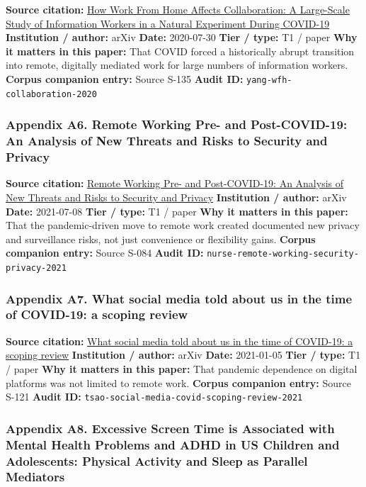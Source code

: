 \documentclass[
  american,
  11pt,
  letterpaper,
]{article}
\begin{document}
\textbf{Source citation:} \href{https://arxiv.org/abs/2007.15584}{How
Work From Home Affects Collaboration: A Large-Scale Study of Information
Workers in a Natural Experiment During COVID-19} \textbf{Institution /
author:} arXiv \textbf{Date:} 2020-07-30 \textbf{Tier / type:} T1 /
paper \textbf{Why it matters in this paper:} That COVID forced a
historically abrupt transition into remote, digitally mediated work for
large numbers of information workers. \textbf{Corpus companion entry:}
Source S-135 \textbf{Audit ID:} \texttt{yang-wfh-collaboration-2020}

\subsubsection{Appendix A6. Remote Working Pre- and Post-COVID-19: An
Analysis of New Threats and Risks to Security and
Privacy}\label{ch-03-appendix-a6-remote-working-pre-and-post-covid-19-an-analysis-of-new-threats-and-risks-to-security-and-privacy}

\textbf{Source citation:} \href{https://arxiv.org/abs/2107.03907}{Remote
Working Pre- and Post-COVID-19: An Analysis of New Threats and Risks to
Security and Privacy} \textbf{Institution / author:} arXiv
\textbf{Date:} 2021-07-08 \textbf{Tier / type:} T1 / paper \textbf{Why
it matters in this paper:} That the pandemic-driven move to remote work
created documented new privacy and surveillance risks, not just
convenience or flexibility gains. \textbf{Corpus companion entry:}
Source S-084 \textbf{Audit ID:}
\texttt{nurse-remote-working-security-privacy-2021}

\subsubsection{Appendix A7. What social media told about us in the time
of COVID-19: a scoping
review}\label{ch-03-appendix-a7-what-social-media-told-about-us-in-the-time-of-covid-19-a-scoping-review}

\textbf{Source citation:} \href{https://arxiv.org/abs/2101.01688}{What
social media told about us in the time of COVID-19: a scoping review}
\textbf{Institution / author:} arXiv \textbf{Date:} 2021-01-05
\textbf{Tier / type:} T1 / paper \textbf{Why it matters in this paper:}
That pandemic dependence on digital platforms was not limited to remote
work. \textbf{Corpus companion entry:} Source S-121 \textbf{Audit ID:}
\texttt{tsao-social-media-covid-scoping-review-2021}

\subsubsection{Appendix A8. Excessive Screen Time is Associated with
Mental Health Problems and ADHD in US Children and Adolescents: Physical
Activity and Sleep as Parallel
Mediators}\label{ch-03-appendix-a8-excessive-screen-time-is-associated-with-mental-health-problems-and-adhd-in-us-children-and-adolescents-physical-activity-and-sleep-as-parallel-mediators}
\end{document}
